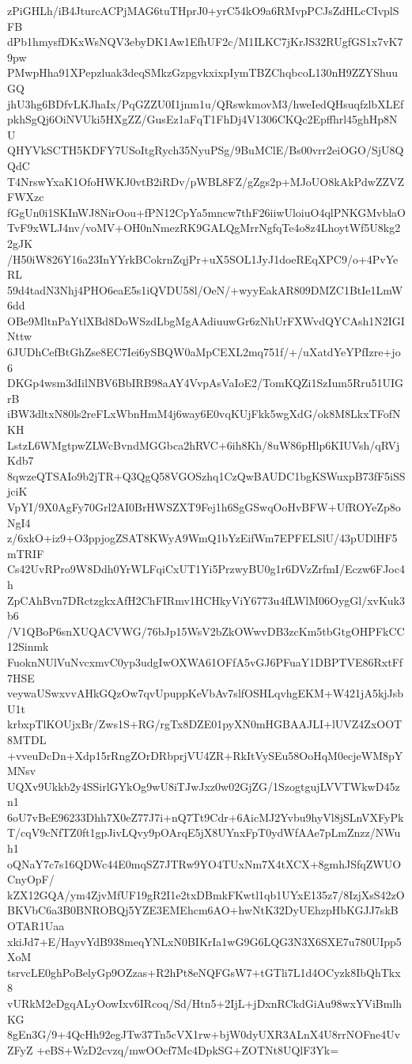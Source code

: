 zPiGHLh/iB4JturcACPjMAG6tuTHprJ0+yrC54kO9a6RMvpPCJsZdHLcCIvplSFB
dPb1hmysfDKxWsNQV3ebyDK1Aw1EfhUF2c/M1ILKC7jKrJS32RUgfGS1x7vK79pw
PMwpHha91XPepzluak3deqSMkzGzpgvkxixpIymTBZChqbcoL130nH9ZZYShuuGQ
jhU3hg6BDfvLKJhaIx/PqGZZU0I1jnm1u/QRswkmovM3/hweIedQHsuqfzlbXLEf
pkhSgQj6OiNVUki5HXgZZ/GusEz1aFqT1FhDj4V1306CKQc2Epffhrl45ghHp8NU
QHYVkSCTH5KDFY7USoItgRych35NyuPSg/9BuMClE/Bs00vrr2eiOGO/SjU8QQdC
T4NrswYxaK1OfoHWKJ0vtB2iRDv/pWBL8FZ/gZgs2p+MJoUO8kAkPdwZZVZFWXzc
fGgUn0i1SKInWJ8NirOou+fPN12CpYa5mncw7thF26iiwUloiuO4qlPNKGMvblaO
TvF9xWLJ4nv/voMV+OH0nNmezRK9GALQgMrrNgfqTe4o8z4LhoytWf5U8kg22gJK
/H50iW826Y16a23InYYrkBCokrnZqjPr+uX5SOL1JyJ1doeREqXPC9/o+4PvYeRL
59d4tadN3Nhj4PHO6eaE5s1iQVDU58l/OeN/+wyyEakAR809DMZC1BtIe1LmW6dd
OBe9MltnPaYtlXBd8DoWSzdLbgMgAAdiuuwGr6zNhUrFXWvdQYCAsh1N2IGINttw
6JUDhCefBtGhZse8EC7Iei6ySBQW0aMpCEXL2mq751f/+/uXatdYeYPfIzre+jo6
DKGp4wsm3dIilNBV6BbIRB98aAY4VvpAsVaIoE2/TomKQZi1SzIum5Rru51UIGrB
iBW3dltxN80ls2reFLxWbnHmM4j6way6E0vqKUjFkk5wgXdG/ok8M8LkxTFofNKH
LstzL6WMgtpwZLWcBvndMGGbca2hRVC+6ih8Kh/8uW86pHlp6KIUVsh/qRVjKdb7
8qwzeQTSAIo9b2jTR+Q3QgQ58VGOSzhq1CzQwBAUDC1bgKSWuxpB73fF5iSSjciK
VpYI/9X0AgFy70Grl2AI0BrHWSZXT9Fej1h6SgGSwqOoHvBFW+UfROYeZp8oNgI4
z/6xkO+iz9+O3ppjogZSAT8KWyA9WmQ1bYzEifWm7EPFELSlU/43pUDlHF5mTRIF
Cs42UvRPro9W8Ddh0YrWLFqiCxUT1Yi5PrzwyBU0g1r6DVzZrfmI/Eczw6FJoc4h
ZpCAhBvn7DRctzgkxAfH2ChFIRmv1HCHkyViY6773u4fLWlM06OygGl/xvKuk3b6
/V1QBoP6snXUQACVWG/76bJp15WsV2bZkOWwvDB3zcKm5tbGtgOHPFkCC12Sinmk
FuoknNUlVuNvcxmvC0yp3udgIwOXWA61OFfA5vGJ6PFuaY1DBPTVE86RxtFf7HSE
veywaUSwxvvAHkGQzOw7qvUpuppKeVbAv7slfOSHLqvhgEKM+W421jA5kjJsbU1t
krbxpTlKOUjxBr/Zws1S+RG/rgTx8DZE01pyXN0mHGBAAJLI+lUVZ4ZxOOT8MTDL
+vveuDcDn+Xdp15rRngZOrDRbprjVU4ZR+RkItVySEu58OoHqM0ecjeWM8pYMNsv
UQXv9Ukkb2y4SSirlGYkOg9wU8iTJwJxz0w02GjZG/1SzogtgujLVVTWkwD45zn1
6oU7vBeE96233Dhh7X0eZ77J7i+nQ7Tt9Cdr+6AicMJ2Yvbu9hyVl8jSLnVXFyPk
T/cqV9cNfTZ0ft1gpJivLQvy9pOArqE5jX8UYnxFpT0ydWfAAe7pLmZnzz/NWuh1
oQNaY7c7s16QDWc44E0mqSZ7JTRw9YO4TUxNm7X4tXCX+8gmhJSfqZWUOCnyOpF/
kZX12GQA/ym4ZjvMfUF19gR2I1e2txDBmkFKwtl1qb1UYxE135z7/8IzjXsS42zO
BKVbC6a3B0BNROBQj5YZE3EMEhcm6AO+hwNtK32DyUEhzpHbKGJJ7skBOTAR1Uaa
xkiJd7+E/HayvYdB938meqYNLxN0BIKrIa1wG9G6LQG3N3X6SXE7u780UIpp5XoM
tsrvcLE0ghPoBelyGp9OZzas+R2hPt8eNQFGsW7+tGTli7L1d4OCyzk8IbQhTkx8
vURkM2eDgqALyOowIxv6IRcoq/Sd/Htn5+2IjL+jDxnRCkdGiAu98wxYViBmlhKG
8gEn3G/9+4QcHh92egJTw37Tn5cVX1rw+bjW0dyUXR3ALnX4U8rrNOFne4UvZFyZ
+eBS+WzD2cvzq/mwOOcf7Mc4DpkSG+ZOTNt8UQlF3Yk=
